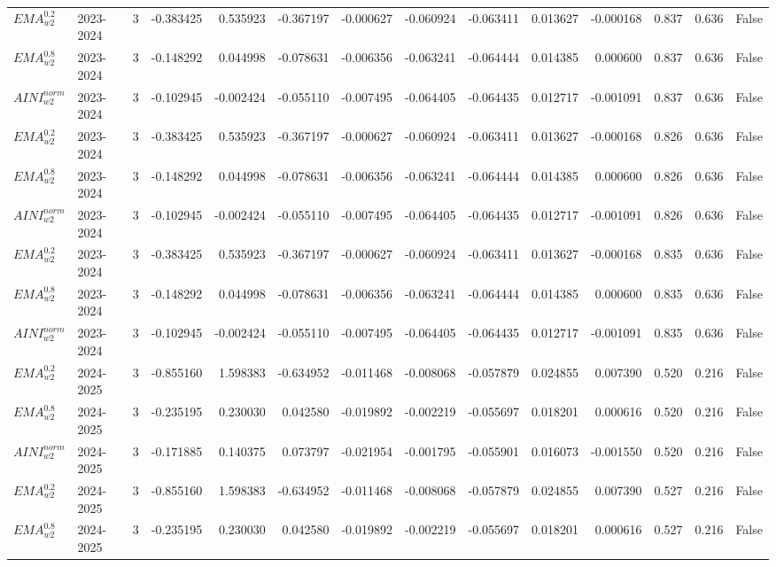 \begin{tabular}{@{}llrrrrrrrrrlll@{}}
$EMA^{0.2}_{w2}$ & 2023-2024 & 3 & -0.383425 & 0.535923 & -0.367197 & -0.000627 & -0.060924 & -0.063411 & 0.013627 & -0.000168 & 0.837 & 0.636 & False \\
$EMA^{0.8}_{w2}$ & 2023-2024 & 3 & -0.148292 & 0.044998 & -0.078631 & -0.006356 & -0.063241 & -0.064444 & 0.014385 & 0.000600 & 0.837 & 0.636 & False \\
$AINI^{norm}_{w2}$ & 2023-2024 & 3 & -0.102945 & -0.002424 & -0.055110 & -0.007495 & -0.064405 & -0.064435 & 0.012717 & -0.001091 & 0.837 & 0.636 & False \\
$EMA^{0.2}_{w2}$ & 2023-2024 & 3 & -0.383425 & 0.535923 & -0.367197 & -0.000627 & -0.060924 & -0.063411 & 0.013627 & -0.000168 & 0.826 & 0.636 & False \\
$EMA^{0.8}_{w2}$ & 2023-2024 & 3 & -0.148292 & 0.044998 & -0.078631 & -0.006356 & -0.063241 & -0.064444 & 0.014385 & 0.000600 & 0.826 & 0.636 & False \\
$AINI^{norm}_{w2}$ & 2023-2024 & 3 & -0.102945 & -0.002424 & -0.055110 & -0.007495 & -0.064405 & -0.064435 & 0.012717 & -0.001091 & 0.826 & 0.636 & False \\
$EMA^{0.2}_{w2}$ & 2023-2024 & 3 & -0.383425 & 0.535923 & -0.367197 & -0.000627 & -0.060924 & -0.063411 & 0.013627 & -0.000168 & 0.835 & 0.636 & False \\
$EMA^{0.8}_{w2}$ & 2023-2024 & 3 & -0.148292 & 0.044998 & -0.078631 & -0.006356 & -0.063241 & -0.064444 & 0.014385 & 0.000600 & 0.835 & 0.636 & False \\
$AINI^{norm}_{w2}$ & 2023-2024 & 3 & -0.102945 & -0.002424 & -0.055110 & -0.007495 & -0.064405 & -0.064435 & 0.012717 & -0.001091 & 0.835 & 0.636 & False \\
$EMA^{0.2}_{w2}$ & 2024-2025 & 3 & -0.855160 & 1.598383 & -0.634952 & -0.011468 & -0.008068 & -0.057879 & 0.024855 & 0.007390 & 0.520 & 0.216 & False \\
$EMA^{0.8}_{w2}$ & 2024-2025 & 3 & -0.235195 & 0.230030 & 0.042580 & -0.019892 & -0.002219 & -0.055697 & 0.018201 & 0.000616 & 0.520 & 0.216 & False \\
$AINI^{norm}_{w2}$ & 2024-2025 & 3 & -0.171885 & 0.140375 & 0.073797 & -0.021954 & -0.001795 & -0.055901 & 0.016073 & -0.001550 & 0.520 & 0.216 & False \\
$EMA^{0.2}_{w2}$ & 2024-2025 & 3 & -0.855160 & 1.598383 & -0.634952 & -0.011468 & -0.008068 & -0.057879 & 0.024855 & 0.007390 & 0.527 & 0.216 & False \\
$EMA^{0.8}_{w2}$ & 2024-2025 & 3 & -0.235195 & 0.230030 & 0.042580 & -0.019892 & -0.002219 & -0.055697 & 0.018201 & 0.000616 & 0.527 & 0.216 & False \\

\end{tabular}
